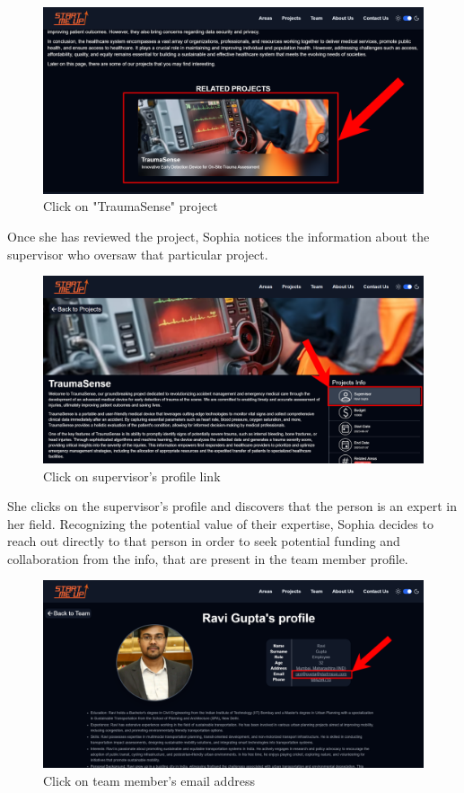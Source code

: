 \documentclass[11pt, letterpaper]{article}
\begin{document}
\begin{figure}[H]
    \centering
    \includegraphics[width=16cm]{images/Scenarios/Scenario3/Screen7.png}
    \caption{Click on "TraumaSense" project}
    \label{fig:scenario3_7}
\end{figure}
\noindent
Once she has reviewed the project, Sophia notices the information about the supervisor who oversaw that particular project. 
\begin{figure}[H]
    \centering
    \includegraphics[width=16cm]{images/Scenarios/Scenario3/Screen8.png}
    \caption{Click on supervisor's profile link}
    \label{fig:scenario3_8}
\end{figure}
\noindent
She clicks on the supervisor's profile and discovers that the person is an expert in her field. 
Recognizing the potential value of their expertise, Sophia decides to reach out directly to that person in order to seek potential funding and collaboration from the info, that are present in the team member profile.
\begin{figure}[H]
    \centering
    \includegraphics[width=16cm]{images/Scenarios/Scenario3/Screen9.png}
    \caption{Click on team member's email address}
    \label{fig:scenario3_9}
\end{figure}
\end{document}
